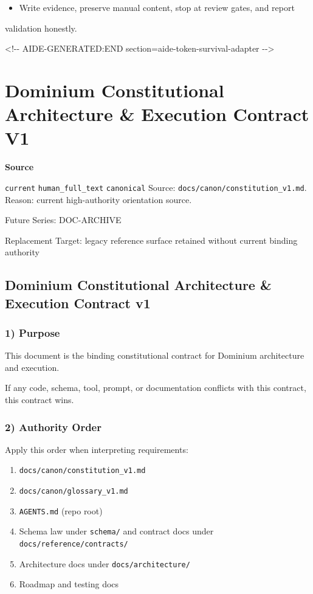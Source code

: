 \documentclass[9pt,a4paper,openany]{book}
\newcommand{\vonecallout}[3]{\par\medskip\noindent\begingroup\setlength{\fboxsep}{7pt}\colorbox{DomCalloutBg}{\parbox{0.94\linewidth}{\textbf{\textcolor{#1}{#2}}\par #3}}\endgroup\par\medskip}
\begin{document}
\begin{itemize}
\item Write evidence, preserve manual content, stop at review gates, and report
\end{itemize}
validation honestly.\allowbreak{}

<!-\allowbreak{}-\allowbreak{} AIDE-\allowbreak{}GENERATED:END section=aide-\allowbreak{}token-\allowbreak{}survival-\allowbreak{}adapter -\allowbreak{}-\allowbreak{}>




\section{Dominium Constitutional Architecture \& Execution Contract V1}

\vonecallout{DomSlate}{Source}{\texttt{current} \texttt{human\_\allowbreak{}full\_\allowbreak{}text} \texttt{canonical} Source: \texttt{docs/\allowbreak{}canon/\allowbreak{}constitution\_\allowbreak{}v1.\allowbreak{}md}.\allowbreak{} Reason: current high-\allowbreak{}authority orientation source.\allowbreak{}}

Future Series: DOC-\allowbreak{}ARCHIVE

Replacement Target: legacy reference surface retained without current binding authority


\subsection{Dominium Constitutional Architecture \& Execution Contract v1}

\subsubsection{1) Purpose}
This document is the binding constitutional contract for Dominium architecture and execution.\allowbreak{}

If any code, schema, tool, prompt, or documentation conflicts with this contract, this contract wins.\allowbreak{}


\subsubsection{2) Authority Order}
Apply this order when interpreting requirements:


\begin{enumerate}
\item \texttt{docs/\allowbreak{}canon/\allowbreak{}constitution\_\allowbreak{}v1.\allowbreak{}md}
\item \texttt{docs/\allowbreak{}canon/\allowbreak{}glossary\_\allowbreak{}v1.\allowbreak{}md}
\item \texttt{AGENTS.\allowbreak{}md} (repo root)
\item Schema law under \texttt{schema/\allowbreak{}} and contract docs under \texttt{docs/\allowbreak{}reference/\allowbreak{}contracts/\allowbreak{}}
\item Architecture docs under \texttt{docs/\allowbreak{}architecture/\allowbreak{}}
\item Roadmap and testing docs
\end{enumerate}
\end{document}
